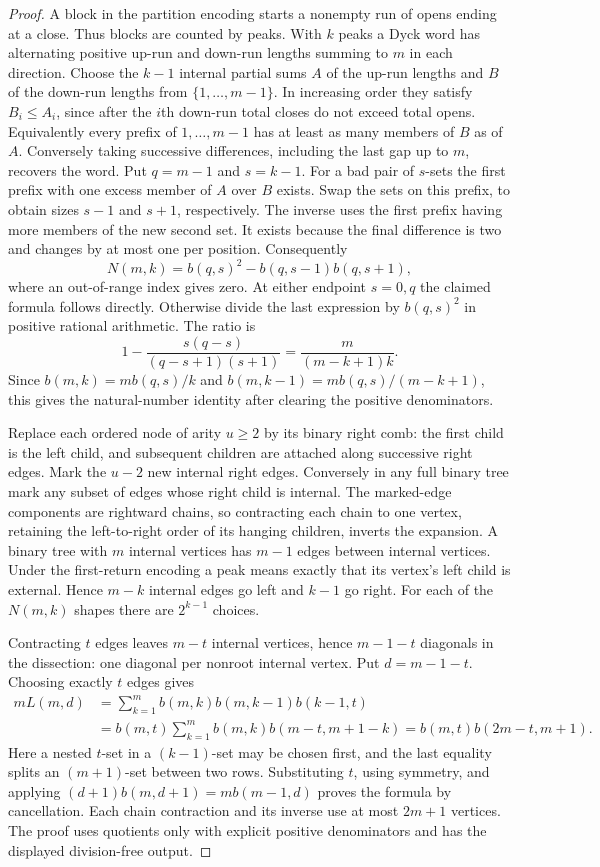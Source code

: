 \begin{proof}
A block in the partition encoding starts a nonempty run of opens ending
at a close. Thus blocks are counted by peaks. With $k$ peaks a Dyck word
has alternating positive up-run and down-run lengths summing to $m$ in
each direction. Choose the $k-1$ internal partial sums $A$ of the up-run
lengths and $B$ of the down-run lengths from $\{1,\ldots,m-1\}$.
In increasing order they satisfy $B_i\le A_i$, since after the $i$th
down-run total closes do not exceed total opens. Equivalently every
prefix of $1,\ldots,m-1$ has at least as many members of $B$ as of $A$.
Conversely taking successive differences, including the last gap up to
$m$, recovers the word. Put $q=m-1$ and $s=k-1$.
For a bad pair of $s$-sets the first prefix with one excess member of
$A$ over $B$ exists. Swap the sets on this prefix, to obtain sizes
$s-1$ and $s+1$, respectively. The inverse uses the first prefix having
more members of the new second set. It exists because the final
difference is two and changes by at most one per position. Consequently
\[
 N(m,k)= b(q,s)^2-b(q,s-1)b(q,s+1),
\]
where an out-of-range index gives zero. At either endpoint $s=0,q$
the claimed formula follows directly. Otherwise divide the last expression
by $b(q,s)^2$ in positive rational arithmetic. The ratio is
\[
 1-\frac{s(q-s)}{(q-s+1)(s+1)}
 =\frac{m}{(m-k+1)k}.
\]
Since $b(m,k)=m b(q,s)/k$ and
$b(m,k-1)=m b(q,s)/(m-k+1)$, this gives the natural-number identity
after clearing the positive denominators.

Replace each ordered node of arity $u\ge2$ by its binary right comb:
the first child is the left child, and subsequent children are attached
along successive right edges. Mark the $u-2$ new internal right edges.
Conversely in any full binary tree mark any subset of edges whose right
child is internal. The marked-edge components are rightward chains, so
contracting each chain to one vertex, retaining the left-to-right order
of its hanging children, inverts the expansion. A binary tree with $m$
internal vertices has $m-1$ edges between internal vertices. Under the
first-return encoding a peak means exactly that its vertex's left child
is external. Hence $m-k$ internal edges go left and $k-1$ go right. For
each of the $N(m,k)$ shapes there are $2^{k-1}$ choices.

Contracting $t$ edges leaves $m-t$ internal vertices, hence $m-1-t$
diagonals in the dissection: one diagonal per nonroot internal vertex.
Put $d=m-1-t$. Choosing exactly $t$ edges gives
\[
 \begin{split}
 m L(m,d)
  &=\sum_{k=1}^m b(m,k)b(m,k-1)b(k-1,t)\\
  &=b(m,t)\sum_{k=1}^m b(m,k)b(m-t,m+1-k)
    =b(m,t)b(2m-t,m+1).
 \end{split}
\]
Here a nested $t$-set in a $(k-1)$-set may be chosen first, and the
last equality splits an $(m+1)$-set between two rows. Substituting $t$,
using symmetry, and applying $(d+1)b(m,d+1)=m b(m-1,d)$ proves the
formula by cancellation. Each chain contraction and its inverse use at
most $2m+1$ vertices. The proof uses quotients only with explicit
positive denominators and has the displayed division-free output.
\end{proof}

